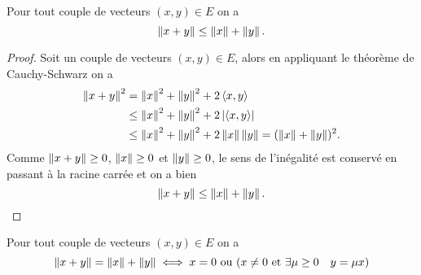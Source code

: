 \begin{theo}
  Pour tout couple de  vecteurs $(x,y) \in E$ on a
  \begin{equation}
    \left\lVert x+y\right\rVert \leq \left\lVert x\right\rVert+\left\lVert y\right\rVert.
  \end{equation}
\end{theo}
\begin{proof}
  Soit un couple de  vecteurs $(x,y) \in E$, alors en appliquant le théorème de Cauchy-Schwarz on a 
  \begin{align}
    \left\lVert x+y\right\rVert^2 &= \left\lVert x\right\rVert^2 + \left\lVert y\right\rVert^2 + 2\left\langle{x},{y}\right\rangle \\
    & \leq \left\lVert x\right\rVert^2 + \left\lVert y\right\rVert^2 + 2\left\lvert\left\langle{x},{y}\right\rangle\right\rvert \\
    & \leq \left\lVert x\right\rVert^2 + \left\lVert y\right\rVert^2 + 2\left\lVert x\right\rVert\left\lVert y\right\rVert=(\left\lVert x\right\rVert+\left\lVert y\right\rVert)^2.
  \end{align}
  Comme $\left\lVert x+y\right\rVert \geq 0$, $\left\lVert x\right\rVert\geq 0$ et $\left\lVert y\right\rVert\ge 0$, le sens de l'inégalité est conservé en passant à la racine carrée et on a bien
  \begin{equation}
    \left\lVert x+y\right\rVert \leq \left\lVert x\right\rVert+\left\lVert y\right\rVert.
  \end{equation}
\end{proof}
%
\begin{prop}
  Pour tout couple de  vecteurs $(x,y) \in E$ on a
  \begin{equation}
    \left\lVert x+y\right\rVert = \left\lVert x\right\rVert+\left\lVert y\right\rVert \iff x=0 \text{~ou~} (x\neq 0 \text{~et~} \exists \mu \geq 0  \quad y=\mu x)
  \end{equation}
\end{prop}
